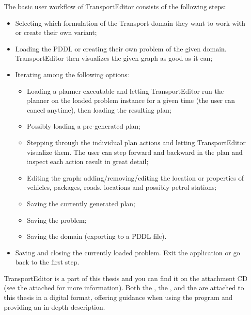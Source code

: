 The basic user workflow of TransportEditor consists of the following steps:
\begin{itemize}
\item Selecting which formulation of the Transport domain they want to work with or create their own variant;
\item Loading the PDDL or creating their own problem of the given domain. TransportEditor then visualizes the given graph as good as it can;
\item Iterating among the following options:
\begin{itemize}
\item Loading a planner executable and letting TransportEditor run the planner on the loaded problem instance for a given time (the user can cancel anytime),
then loading the resulting plan;
\item Possibly loading a pre-generated plan;
\item Stepping through the individual plan actions and letting TransportEditor visualize them.
The user can step forward and backward in the plan and inspect each action result in great detail;
\item Editing the graph: adding/removing/editing the location or properties of vehicles, packages, roads, locations and possibly petrol stations;
\item Saving the currently generated plan;
\item Saving the problem;
\item Saving the domain (exporting to a PDDL file).
\end{itemize}
\item Saving and closing the currently loaded problem. Exit the application or go back to the first step.
\end{itemize}

TransportEditor is a part of this thesis and you can find it on the attachment CD (see the attached  for more information). Both the ,
the , and the  are attached to this thesis in a digital format, offering guidance when
using the program and providing an in-depth description.
















